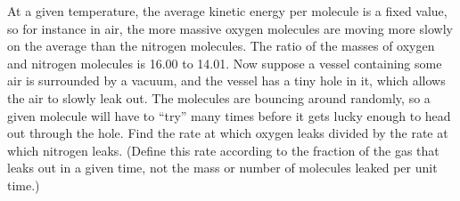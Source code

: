At a given
temperature, the average kinetic energy per molecule is a fixed value,
so for instance in air, the more massive oxygen molecules are moving more slowly
on the average than the nitrogen molecules. The ratio of the masses of
oxygen and nitrogen molecules is 16.00 to 14.01. Now suppose
a vessel containing some air is surrounded by a vacuum, and the vessel has
a tiny hole in it, which allows the air to slowly leak out. The molecules
are bouncing around randomly, so a given molecule will have to ``try'' many
times before it gets lucky enough to head out through the hole. 
Find the rate at which oxygen leaks divided by the rate at which nitrogen leaks.
(Define this rate according to the fraction of the gas that leaks out in a given
time, not the mass or number of molecules leaked per unit time.)\answercheck
